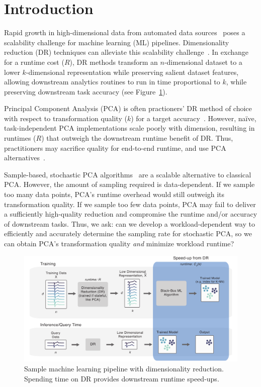 
\section{Introduction}
\label{sec:intro}

Rapid growth in high-dimensional data from automated data sources~\cite{plato,macrobase-cidr} poses a scalability challenge for machine learning (ML) pipelines.
Dimensionality reduction (DR) techniques can alleviate this scalability challenge~\cite{keogh-indexing,local-dr,decade,gemini}.
In exchange for a runtime cost ($R$), DR methods transform an $n$-dimensional dataset to a lower $k$-dimensional representation while preserving salient dataset features, allowing downstream analytics routines to run in time proportional to $k$, while preserving downstream task accuracy (see Figure~\ref{fig:pipeline}).

Principal Component Analysis (PCA) is often practioners' DR method of choice with respect to transformation quality ($k$) for a target accuracy~\cite{jolbook}. 
However, na\"{i}ve, task-independent PCA implementations scale poorly with dimension, resulting in runtimes ($R$) that outweigh the downstream runtime benefit of DR. 
Thus, practitioners may sacrifice quality for end-to-end runtime, and use PCA alternatives~\cite{keogh-study}. 

Sample-based, stochastic PCA algorithms~\cite{shamir,re-new} are a scalable alternative to classical PCA.
However, the amount of sampling required is data-dependent.
If we sample too many data points, PCA's runtime overhead would still outweigh its transformation quality.
If we sample too few data points, PCA may fail to deliver a sufficiently high-quality reduction and compromise the runtime and/or accuracy of downstream tasks.
Thus, we ask: can we develop a workload-dependent way to efficiently and accurately determine the sampling rate for stochastic PCA, so we can obtain PCA's transformation quality \emph{and} minimize workload runtime?

\begin{figure}
\includegraphics[width=\linewidth]{figs/pipeline.pdf}
\caption[]{Sample machine learning pipeline with dimensionality reduction. Spending time on DR provides downstream runtime speed-ups.}
\label{fig:pipeline}
\end{figure}

